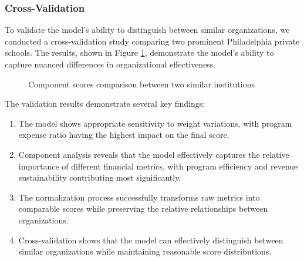 \documentclass[12pt]{article}
\begin{document}
\subsubsection{Cross-Validation}

To validate the model's ability to distinguish between similar organizations, we conducted a cross-validation study comparing two prominent Philadelphia private schools. The results, shown in Figure \ref{fig:crossval}, demonstrate the model's ability to capture nuanced differences in organizational effectiveness.

\begin{figure}[H]
\centering
{}
\caption{Component scores comparison between two similar institutions}
\label{fig:crossval}
\end{figure}

The validation results demonstrate several key findings:

\begin{enumerate}
    \item The model shows appropriate sensitivity to weight variations, with program expense ratio having the highest impact on the final score.
    
    \item Component analysis reveals that the model effectively captures the relative importance of different financial metrics, with program efficiency and revenue sustainability contributing most significantly.
    
    \item The normalization process successfully transforms raw metrics into comparable scores while preserving the relative relationships between organizations.
    
    \item Cross-validation shows that the model can effectively distinguish between similar organizations while maintaining reasonable score distributions.
\end{enumerate}
\end{document}
